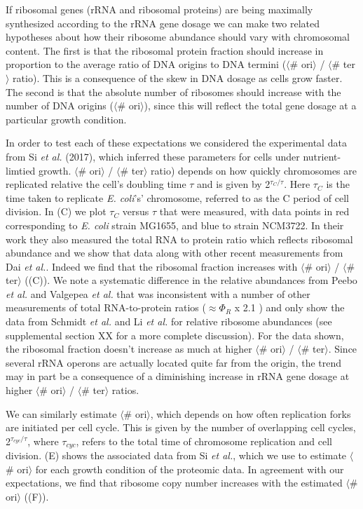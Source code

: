 If ribosomal genes (rRNA and ribosomal proteins) are being maximally synthesized
according to the rRNA gene dosage we can make two related hypotheses about how
their ribosome abundance should vary with chromosomal content. The first is that
the ribosomal protein fraction should increase in proportion  to the average
ratio of DNA origins to DNA termini ($\langle$\# ori$\rangle$ / $\langle$\#
ter$\rangle$ ratio). This is a consequence of the skew in DNA dosage as cells
grow faster. The second is that the absolute number of ribosomes should increase
with the number of DNA origins ($\langle$\# ori$\rangle$), since this will
reflect the total gene dosage at a particular growth condition.

In order to test each of these expectations we considered the experimental data
from Si \textit{et al.} (2017), which inferred these parameters for cells under
nutrient-limtied growth. $\langle$\# ori$\rangle$ / $\langle$\# ter$\rangle$
ratio) depends on how quickly chromosomes are replicated relative the cell's
doubling time $\tau$ and is given by 2$^{\tau_C / \tau}$. Here $\tau_C$ is the
time taken to replicate \textit{E. coli}'s' chromosome, referred to as the C
period of cell division.  In (C) we plot $\tau_C$ versus
$\tau$ that were measured, with data points in red corresponding to \textit{E.
coli} strain MG1655, and blue to strain NCM3722. In their work they also
measured the total RNA to protein ratio  which reflects ribosomal abundance and
we show that data along with other recent  measurements from Dai \textit{et
al.}. Indeed we find that the ribosomal fraction increases with $\langle$\#
ori$\rangle$ / $\langle$\# ter$\rangle$ ((C)). We note a
systematic difference in the relative abundances from Peebo \textit{et al.} and
Valgepea \textit{et al.} that was inconsistent with a number of other
measurements of total RNA-to-protein ratios ($\approx \Phi_R$ x 2.1
\cite{dai2016}) and only show the data from Schmidt \textit{et al.} and Li
\textit{et al.} for relative ribosome abundances (see supplemental section XX
for a more complete discussion). For the data shown, the ribosomal fraction
doesn't  increase as much at higher $\langle$\# ori$\rangle$ / $\langle$\#
ter$\rangle$. Since several rRNA operons are actually located  quite far from
the origin, the trend may in part be a consequence of a diminishing  increase in
rRNA gene dosage at higher $\langle$\# ori$\rangle$ / $\langle$\# ter$\rangle$
ratios.

We can similarly estimate $\langle$\# ori$\rangle$, which depends on how often
replication forks are initiated per cell cycle. This is given by the number of
overlapping cell cycles,  2$^{\tau_{cyc} / \tau}$, where $\tau_{cyc}$, refers to
the total time of chromosome replication and cell division.
(E) shows the associated data from Si \textit{et al.},
which we use to estimate $\langle$\# ori$\rangle$  for each growth condition of
the proteomic data. In agreement with our expectations, we find that ribosome
copy number increases with the estimated $\langle$\# ori$\rangle$
((F)).

